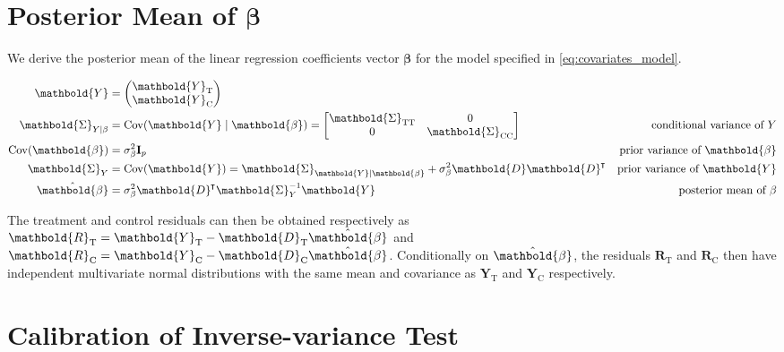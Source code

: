 \documentclass[letter]{article}
\DeclarePairedDelimiter{\parenthesis}{\lparen}{\rparen}
\newcommand{\del}[1]{\parenthesis*{#1}}
\DeclareMathOperator{\cov}{{Cov}}
\newcommand*{\trans}{^{\mkern-1.5mu\intercal}}
\newcommand{\treat}{\mathrm{T}}
\newcommand{\ctrol}{\mathrm{C}}
\newcommand{\sigmabeta}{\sigma_{\beta}}
\newcommand{\Yvec}{\mathbold{Y}}
\newcommand{\yt}{\Yvec_{\treat}}
\newcommand{\yc}{\Yvec_{\ctrol}}
\newcommand{\betavec}{\mathbold{\beta}}
\newcommand{\residvec}{\mathbold{R}}
\newcommand{\eye}{\mathbf{I}}
\newcommand{\Dmat}{\mathbold{D}}
\newcommand{\SigmaMat}{\mathbold{\Sigma}}
\newcommand{\STT}{\SigmaMat_{\treat \treat}}
\newcommand{\SCC}{\SigmaMat_{\ctrol \ctrol}}
\begin{document}
    	\hypertarget{posterior-mean-of-betavec}{%
\section{\texorpdfstring{Posterior Mean of \(\betavec\)}{Posterior Mean of \textbackslash{}betavec}}\label{posterior-mean-of-betavec}}

\label{sec:betahat}

We derive the posterior mean of the linear regression coefficients vector \(\betavec\) for the model specified in \eqref{eq:covariates_model}.
    


    	\begin{equation}
\begin{aligned}
    \Yvec &= \begin{pmatrix}
            \yt \\
            \yc
        \end{pmatrix}
        \\
    \SigmaMat_{Y \mid \beta} &= \cov\del{\Yvec \mid \betavec }
        = \begin{bmatrix}
            \STT & 0 \\
            0 & \SCC
          \end{bmatrix}
        & \text{conditional variance of $Y$} \\
    \cov\del{\betavec} &= \sigmabeta^2 \eye_p
        & \text{prior variance of $\betavec$} \\
    \SigmaMat_Y &= \cov\del{\Yvec} 
            = \SigmaMat_{\Yvec \mid \betavec} 
              + \sigmabeta^2 \Dmat \Dmat\trans
        & \text{prior variance of $\Yvec$} \\
    \hat\betavec &= \sigmabeta^2 \Dmat\trans\SigmaMat_{Y}^{-1} \Yvec
        & \text{posterior mean of $\beta$}
\end{aligned}
\end{equation}
    


    	The treatment and control residuals can then be obtained respectively as \(\residvec_\treat = \yt - \Dmat_\treat \hat\betavec\) and \(\residvec_\ctrol = \yc - \Dmat_\ctrol \hat\betavec\).
Conditionally on \(\hat\betavec\), the residuals \(\residvec_\treat\) and \(\residvec_\ctrol\) then have independent multivariate normal distributions with the same mean and covariance as \(\yt\) and \(\yc\) respectively.
    


    	\hypertarget{calibration-of-inverse-variance-test}{%
\section{Calibration of Inverse-variance Test}\label{calibration-of-inverse-variance-test}}
    
\end{document}
